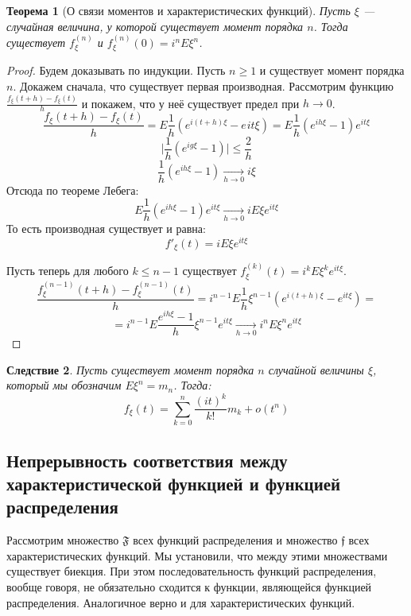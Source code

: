 \documentclass[11pt,openany,a4paper]{scrartcl}
\theoremstyle{plain}
\newtheorem{theorem}{Теорема}[subsection]
\newtheorem{corollary}[theorem]{Следствие}
\theoremstyle{definition}
\newcommand{\underto}[1]{\xrightarrow[#1]{}}
\begin{document}
\begin{theorem}[О связи моментов и характеристических функций]
    Пусть $\xi$ — случайная величина, у которой существует момент порядка $n$.
    Тогда существует $f_\xi^{(n)}$ и $f_\xi^{(n)}(0) = i^n E\xi^n$.
\end{theorem}
\begin{proof}
    Будем доказывать по индукции.
    Пусть $n \geqslant 1$ и существует момент порядка $n$. Докажем сначала,
    что существует первая производная. Рассмотрим функцию
    $\frac{f_\xi(t + h) - f_\xi(t)}{h}$ и покажем, что у неё существует предел
    при $h \to 0$.
    $$
    \frac{f_\xi(t + h) - f_\xi(t)}{h} = E\frac{1}{h}(e^{i(t+h)\xi} - e^{}it\xi) =
    E\frac{1}{h}(e^{ih\xi} - 1)e^{it\xi}
    $$
    $$
    \bigg|\frac{1}{h}(e^{ig\xi} - 1)\bigg| \leqslant \frac{2}{h}
    $$
    $$
    \frac{1}{h}(e^{ih\xi} - 1) \underto{h \to 0} i\xi
    $$
    Отсюда по теореме Лебега:
    $$
    E\frac{1}{h}(e^{ih\xi} - 1)e^{it\xi} \underto{h \to 0} iE\xi e^{it\xi}
    $$
    То есть производная существует и равна:
    $$
    f'_\xi(t) = iE\xi e^{it\xi}
    $$
    
    Пусть теперь для любого $k \leqslant n - 1$ существует
    $f_\xi^{(k)}(t) = i^k E\xi^k e^{it\xi}$.
    $$
    \frac{f_\xi^{(n-1)}(t + h) - f_\xi^{(n-1)}(t)}{h} =
    i^{n-1}E\frac{1}{h}\xi^{n-1}(e^{i(t+h)\xi} - e^{it\xi}) =
    $$
    $$
    = i^{n-1}E\frac{e^{ih\xi} - 1}{h} \xi^{n-1} e^{it\xi} \underto{h \to 0}
    i^nE\xi^n e^{it\xi}
    $$
\end{proof}
\begin{corollary}
    Пусть существует момент порядка $n$ случайной величины $\xi$, который мы
    обозначим $E\xi^n = m_n$. Тогда:
    $$
    f_\xi(t) = \sum\limits_{k=0}^n \frac{(it)^k}{k!}m_k + o(t^n)
    $$
\end{corollary}

\subsection{Непрерывность соответствия между характеристической функцией и функцией
распределения}

Рассмотрим множество $\mathfrak F$ всех функций распределения и множество
$\mathfrak f$ всех характеристических функций. Мы установили, что между этими
множествами существует биекция. При этом последовательность функций распределения,
вообще говоря, не обязательно сходится к функции, являющейся функцией 
распределения. Аналогичное верно и для характеристических функций.
\end{document}
